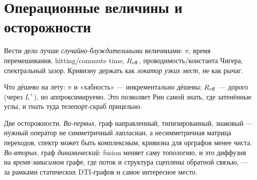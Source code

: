 \begin{center}
\end{center}

\section{Операционные величины и осторожности}

Вести дело лучше \emph{случайно-блуждательными} величинами: $\pi$, время
перемешивания, hitting/commute time, $R_{\mathrm{eff}}$, проводимость/константа Чигера,
спектральный зазор. Кривизну держать как \emph{локатор узких мест}, не как рычаг.

Что дёшево на лету: $\pi$ и «хабность» — инкрементально дёшевы; $R_{\mathrm{eff}}$ — дорого
(через $L^{+}$), но аппроксимируемо. Это позволяет Рин самой знать, где затенённые
углы, и гнать туда телепорт-скраб прицельно.

Две осторожности. \emph{Во-первых}, граф направленный, типизированный, знаковый —
нужный оператор не симметричный лапласиан, а несимметричная матрица переходов,
спектр может быть комплексным, кривизна для орграфов менее чиста. \emph{Во-вторых},
граф \emph{динамический}: fusion меняет саму топологию, и это диффузия на
\emph{время-зависимом} графе, где поток и структура сцеплены обратной связью, — за
рамками статических DTI-графов и самое интересное место.
